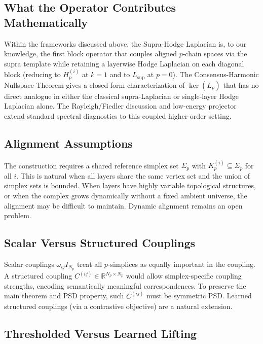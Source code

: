 \documentclass[11pt]{article}
\theoremstyle{definition}
\theoremstyle{remark}
\newcommand{\R}{\mathbb{R}}
\newcommand{\Lsup}{L_{\mathrm{sup}}}
\begin{document}
\subsection{What the Operator Contributes Mathematically}

Within the frameworks discussed above, the Supra-Hodge Laplacian is, to our
knowledge, the first block operator that couples aligned $p$-chain spaces via
the supra template while retaining a layerwise Hodge Laplacian on each diagonal
block (reducing to $H_p^{(i)}$ at $k=1$ and to $\Lsup$ at $p=0$). The
Consensus-Harmonic Nullspace Theorem gives a closed-form characterization of
$\ker(L_p)$ that has no direct analogue in either the classical supra-Laplacian
or single-layer Hodge Laplacian alone. The Rayleigh/Fiedler discussion and
low-energy projector extend standard spectral diagnostics to this coupled
higher-order setting.

\subsection{Alignment Assumptions}

The construction requires a shared reference simplex set $\Sigma_p$ with
$K_p^{(i)}\subseteq\Sigma_p$ for all $i$. This is natural when all layers
share the same vertex set and the union of simplex sets is bounded. When layers
have highly variable topological structures, or when the complex grows
dynamically without a fixed ambient universe, the alignment may be difficult to
maintain. Dynamic alignment remains an open problem.

\subsection{Scalar Versus Structured Couplings}

Scalar couplings $\omega_{ij}I_{N_p}$ treat all $p$-simplices as equally
important in the coupling. A structured coupling $C^{(ij)}\in\R^{N_p\times N_p}$
would allow simplex-specific coupling strengths, encoding semantically
meaningful correspondences. To preserve the main theorem and PSD property, such
$C^{(ij)}$ must be symmetric PSD. Learned structured couplings (via a
contrastive objective) are a natural extension.

\subsection{Thresholded Versus Learned Lifting}
\end{document}
